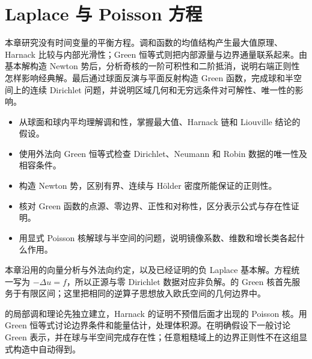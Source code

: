 \chapter{Laplace 与 Poisson 方程}
\label{b2:ch:13}
\begin{chapterabstract}
本章研究没有时间变量的平衡方程。调和函数的均值结构产生最大值原理、Harnack 比较与内部光滑性；Green 恒等式则把内部源量与边界通量联系起来。由基本解构造 Newton 势后，分析奇核的一阶可积性和二阶抵消，说明右端正则性怎样影响经典解。最后通过球面反演与平面反射构造 Green 函数，完成球和半空间上的连续 Dirichlet 问题，并说明区域几何和无穷远条件对可解性、唯一性的影响。
\end{chapterabstract}

\begin{learninggoals}
\begin{itemize}
\item\label{b2:item:13-goal-mean}从球面和球内平均理解调和性，掌握最大值、Harnack 链和 Liouville 结论的假设。
\item\label{b2:item:13-goal-boundary}使用外法向 Green 恒等式检查 Dirichlet、Neumann 和 Robin 数据的唯一性及相容条件。
\item\label{b2:item:13-goal-potential}构造 Newton 势，区别有界、连续与 Hölder 密度所能保证的正则性。
\item\label{b2:item:13-goal-green}核对 Green 函数的点源、零边界、正性和对称性，区分表示公式与存在性证明。
\item\label{b2:item:13-goal-models}用显式 Poisson 核解球与半空间的问题，说明镜像系数、维数和增长类各起什么作用。
\end{itemize}
\end{learninggoals}

本章沿用的向量分析与外法向约定，以及已经证明的负 Laplace 基本解。方程统一写为 \(-\Delta u=f\)，所以正源与零 Dirichlet 数据对应非负解。的 Green 核首先服务于有限区间；这里把相同的逆算子思想放入欧氏空间的几何边界中。

\ProseParagraphBreak

的局部调和理论先独立建立，Harnack 的证明不预借后面才出现的 Poisson 核。用 Green 恒等式讨论边界条件和能量估计，处理体积源。在明确假设下一般讨论 Green 表示，并在球与半空间完成存在性；任意粗糙域上的边界正则性不在这组显式构造中自动得到。

